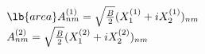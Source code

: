 \begin{equation}
\begin{array}{l}
\lb{area}
A_{nm}^{(1)} = \sqrt{B \over 2} (X_1^{(1)} + i X_2^{(1)})_{nm}\\
A_{nm}^{(2)} = \sqrt{B \over 2} (X_1^{(2)} + i X_2^{(2)})_{nm}
\end{array}
\end{equation}

